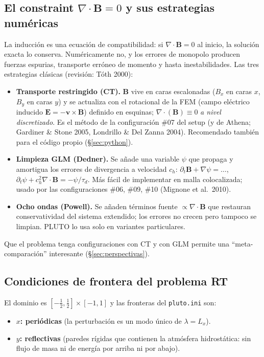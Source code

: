 \documentclass[11pt,a4paper]{article}
\newcommand{\B}{\mathbf{B}}
\newcommand{\vct}{\mathbf{v}}
\newcommand{\dif}{\partial_t}
\newcommand{\difdiv}[1]{\nabla\cdot\left(#1\right)}
\newcommand{\code}[1]{\texttt{#1}}
\begin{document}
\subsection{El constraint $\nabla\cdot\B=0$ y sus estrategias numéricas}

La inducción es una ecuación de compatibilidad: si $\nabla\cdot\B=0$ al inicio, la solución
exacta lo conserva. Numéricamente no, y los errores de monopolo producen fuerzas espurias,
transporte erróneo de momento y hasta inestabilidades. Las tres estrategias clásicas
(revisión: Tóth 2000):

\begin{itemize}[nosep]
  \item \textbf{Transporte restringido (CT).} $\B$ vive en caras escalonadas
  ($B_x$ en caras $x$, $B_y$ en caras $y$) y se actualiza con el rotacional de la FEM
  (campo eléctrico inducido $\mathbf{E}=-\vct\times\B$) definido en esquinas;
  $\difdiv{\B}\equiv 0$ \emph{a nivel discretizado}. Es el método de la configuración
  \#07 del setup (y de Athena; Gardiner \& Stone 2005, Londrillo \& Del Zanna 2004).
  Recomendado también para el código propio (\S\ref{sec:python}).
  \item \textbf{Limpieza GLM (Dedner).} Se añade una variable $\psi$ que propaga y amortigua
  los errores de divergencia a velocidad $c_h$: $\dif\B + \nabla\psi = \dots$,
  $\dif\psi + c_h^2\nabla\cdot\B = -\psi/\tau_d$. Más fácil de implementar en malla
  colocalizada; usado por las configuraciones \#06, \#09, \#10 (Mignone et al.\ 2010).
  \item \textbf{Ocho ondas (Powell).} Se añaden términos fuente $\propto\nabla\cdot\B$ que
  restauran conservatividad del sistema extendido; los errores no crecen pero tampoco se
  limpian. PLUTO lo usa solo en variantes particulares.
\end{itemize}

Que el problema tenga configuraciones con CT y con GLM permite una ``meta-comparación''
interesante (§\ref{sec:perspectivas}).

\subsection{Condiciones de frontera del problema RT}

El dominio es $\left[-\tfrac12,\tfrac12\right]\times[-1,1]$ y las fronteras del
\code{pluto.ini} son:

\begin{itemize}[nosep]
  \item \textbf{$x$: periódicas} (la perturbación es un modo único de $\lambda=L_x$).
  \item \textbf{$y$: reflectivas} (paredes rígidas que contienen la atmósfera hidrostática:
  sin flujo de masa ni de energía por arriba ni por abajo).
\end{itemize}
\end{document}
